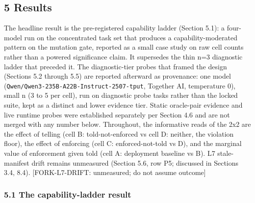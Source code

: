 \documentclass[
]{article}
\begin{document}
\subsection{5 Results}\label{results}

The headline result is the pre-registered capability ladder (Section
5.1): a four-model run on the concentrated task set that produces a
capability-moderated pattern on the mutation gate, reported as a small
case study on raw cell counts rather than a powered significance claim.
It supersedes the thin n=3 diagnostic ladder that preceded it. The
diagnostic-tier probes that framed the design (Sections 5.2 through 5.5)
are reported afterward as provenance: one model
(\texttt{Qwen/Qwen3-235B-A22B-Instruct-2507-tput}, Together AI,
temperature 0), small n (3 to 5 per cell), run on diagnostic probe tasks
rather than the locked suite, kept as a distinct and lower evidence
tier. Static oracle-pair evidence and live runtime probes were
established separately per Section 4.6 and are not merged with any
number below. Throughout, the informative reads of the 2x2 are the
effect of telling (cell B: told-not-enforced vs cell D: neither, the
violation floor), the effect of enforcing (cell C: enforced-not-told vs
D), and the marginal value of enforcement given told (cell A: deployment
baseline vs B). L7 stale-manifest drift remains unmeasured (Section 5.6,
row P5; discussed in Sections 3.4, 8.4). {[}FORK-L7-DRIFT: unmeasured;
do not assume outcome{]}

\subsubsection{5.1 The capability-ladder
result}\label{the-capability-ladder-result}
\end{document}
